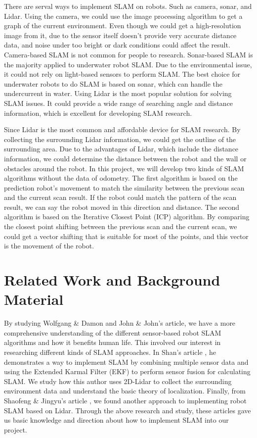 \documentclass[conference]{IEEEtran}
\begin{document}
There are serval ways to implement SLAM on robots. Such as camera, sonar, and Lidar. Using the camera, we could use the image processing algorithm to get a graph of the current environment. Even though we could get a high-resolution image from it, due to the sensor itself doesn't provide very accurate distance data, and noise under too bright or dark conditions could affect the result. Camera-based SLAM is not common for people to research. Sonar-based SLAM is the majority applied to underwater robot SLAM. Due to the environmental issue, it could not rely on light-based sensors to perform SLAM. The best choice for underwater robots to do SLAM is based on sonar, which can handle the undercurrent in water\cite{b4}. Using Lidar is the most popular solution for solving SLAM issues. It could provide a wide range of searching angle and distance information, which is excellent for developing SLAM research. 

Since Lidar is the most common and affordable device for SLAM research. By collecting the surrounding Lidar information, we could get the outline of the surrounding area. Due to the advantages of Lidar, which include the distance information, we could determine the distance between the robot and the wall or obstacles around the robot. In this project, we will develop two kinds of SLAM algorithms without the data of odometry. The first algorithm is based on the prediction robot’s movement to match the similarity between the previous scan and the current scan result. If the robot could match the pattern of the scan result, we can say the robot moved in this direction and distance. The second algorithm is based on the Iterative Closest Point (ICP) algorithm. By comparing the closest point shifting between the previous scan and the current scan, we could get a vector shifting that is suitable for most of the points, and this vector is the movement of the robot. 

\section{Related Work and Background Material}
By studying Wolfgang \& Damon\cite{b1} and John \& John\cite{b4}'s article, we have a more comprehensive understanding of the different sensor-based robot SLAM algorithms and how it benefits human life. This involved our interest in researching different kinds of SLAM approaches.  In Shan's article \cite{b2}, he demonstrates a way to implement SLAM by combining multiple sensor data and using the Extended Karmal Filter (EKF) to perform sensor fusion for calculating SLAM. We study how this author uses 2D-Lidar to collect the surrounding environment data and understand the basic theory of localization. Finally, from Shaofeng \& Jingyu's article \cite{b3}, we found another approach to implementing robot SLAM based on Lidar. Through the above research and study, these articles gave us basic knowledge and direction about how to implement SLAM into our project.
\end{document}
